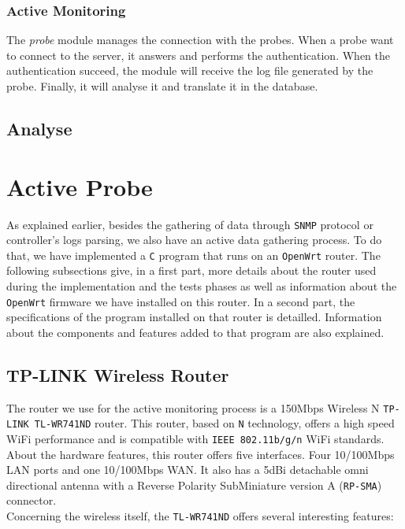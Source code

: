 \subsubsection{Active Monitoring}
The \emph{probe} module manages the connection with the probes. When a probe want to connect to the server, it answers and performs the authentication. When the authentication succeed, the module will receive the log file generated by the probe. Finally, it will analyse it and translate it in the database.

\subsection{Analyse}


\section{Active Probe}
As explained earlier, besides the gathering of data through \texttt{SNMP} protocol or controller's logs parsing, we also have an active data gathering process. To do that, we have implemented a \texttt{C} program that runs on an \texttt{OpenWrt} router. The following subsections give, in a first part, more details about the router used during the implementation and the tests phases as well as information about the \texttt{OpenWrt} firmware we have installed on this router. In a second part, the specifications of the program installed on that router is detailled. Information about the components and features added to that program are also explained.\\


\subsection{TP-LINK Wireless Router}
The router we use for the active monitoring process is a 150Mbps Wireless N \texttt{TP-LINK TL-WR741ND} router. This router, based on \texttt{N} technology, offers a high speed WiFi performance and is compatible with \texttt{IEEE 802.11b/g/n} WiFi standards. \\
About the hardware features, this router offers five interfaces. Four 10/100Mbps LAN ports and one 10/100Mbps WAN. It also has a 5dBi detachable omni directional antenna with a Reverse Polarity SubMiniature version A (\texttt{RP-SMA}) connector.\\
Concerning the wireless itself, the \texttt{TL-WR741ND} offers several interesting features\cite{tplink}:

